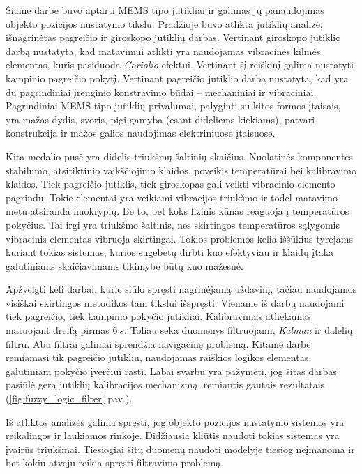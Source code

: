 Šiame darbe buvo aptarti MEMS tipo jutikliai ir galimas jų panaudojimas objekto pozicijos nustatymo tikslu. 
Pradžioje buvo atlikta jutiklių analizė, išnagrinėtas pagreičio ir giroskopo jutiklių darbas. 
Vertinant giroskopo jutiklio darbą nustatyta, kad matavimui atlikti yra naudojamas vibracinės kilmės elementas, kuris pasiduoda \textit{Coriolio} efektui. 
Vertinant šį reiškinį galima nustatyti kampinio pagreičio pokytį. 
Vertinant pagreičio jutiklio darbą nustatyta, kad yra du pagrindiniai įrenginio konstravimo būdai -- mechaniniai ir vibraciniai. 
Pagrindiniai MEMS tipo jutiklių privalumai, palyginti su kitos formos įtaisais, yra mažas dydis, svoris, pigi gamyba (esant dideliems kiekiams), patvari konstrukcija ir mažos galios naudojimas elektriniuose įtaisuose.

Kita medalio pusė yra didelis triukšmų šaltinių skaičius. 
Nuolatinės komponentės stabilumo, atsitiktinio vaikščiojimo klaidos, poveikis temperatūrai bei kalibravimo klaidos. 
Tiek pagreičio jutiklis, tiek giroskopas gali veikti vibracinio elemento pagrindu. 
Tokie elementai yra veikiami vibracijos triukšmo ir todėl matavimo metu atsiranda nuokrypių. 
Be to, bet koks fizinis kūnas reaguoja į temperatūros pokyčius. 
Tai irgi yra triukšmo šaltinis, nes skirtingos temperatūros sąlygomis vibracinis elementas vibruoja skirtingai. 
Tokios problemos kelia iššūkius tyrėjams kuriant tokias sistemas, kurios sugebėtų dirbti kuo efektyviau ir klaidų įtaka galutiniams skaičiavimams tikimybė būtų kuo mažesnė. 

Apžvelgti keli darbai, kurie siūlo spręsti nagrinėjamą uždavinį, tačiau naudojamos visiškai skirtingos metodikos tam tikslui išspręsti. 
Viename iš darbų naudojami tiek pagreičio, tiek kampinio pokyčio jutikliai. 
Kalibravimas atliekamas matuojant dreifą pirmas $6~s$. 
Toliau seka duomenys filtruojami, \textit{Kalman} ir dalelių filtru. 
Abu filtrai galimai sprendžia navigacinę problemą. 
Kitame darbe remiamasi tik pagreičio jutikliu, naudojamas raiškios logikos elementas galutiniam pokyčio įverčiui rasti. 
Labai svarbu yra pažymėti, jog šitas darbas pasiūlė gerą jutiklių kalibracijos mechanizmą, remiantis gautais rezultatais (\ref{fig:fuzzy_logic_filter} pav.). 

Iš atliktos analizės galima spręsti, jog objekto pozicijos nustatymo sistemos yra reikalingos ir laukiamos rinkoje. 
Didžiausia kliūtis naudoti tokias sistemas yra įvairūs triukšmai. 
Tiesiogiai šitų duomenų naudoti modelyje tiesiog neįmanoma ir bet kokiu atveju reikia spręsti filtravimo problemą.

